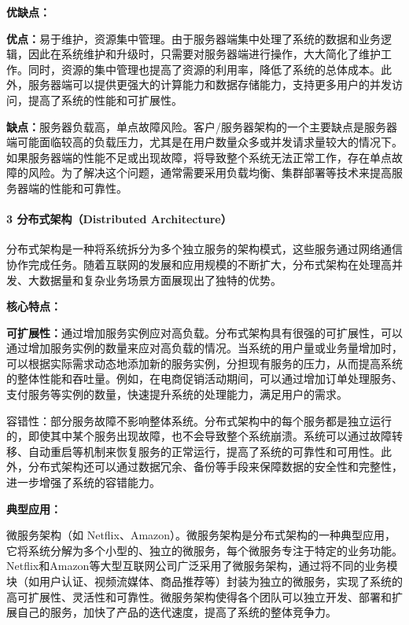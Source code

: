 \textbf{优缺点：}

\textbf{优点：}易于维护，资源集中管理。由于服务器端集中处理了系统的数据和业务逻辑，因此在系统维护和升级时，只需要对服务器端进行操作，大大简化了维护工作。同时，资源的集中管理也提高了资源的利用率，降低了系统的总体成本。此外，服务器端可以提供更强大的计算能力和数据存储能力，支持更多用户的并发访问，提高了系统的性能和可扩展性。

\textbf{缺点：}服务器负载高，单点故障风险。客户/服务器架构的一个主要缺点是服务器端可能面临较高的负载压力，尤其是在用户数量众多或并发请求量较大的情况下。如果服务器端的性能不足或出现故障，将导致整个系统无法正常工作，存在单点故障的风险。为了解决这个问题，通常需要采用负载均衡、集群部署等技术来提高服务器端的性能和可靠性。

\paragraph{3 分布式架构（Distributed Architecture）}\label{ux5206ux5e03ux5f0fux67b6ux6784distributed-architecture}

分布式架构是一种将系统拆分为多个独立服务的架构模式，这些服务通过网络通信协作完成任务。随着互联网的发展和应用规模的不断扩大，分布式架构在处理高并发、大数据量和复杂业务场景方面展现出了独特的优势。

\textbf{核心特点：}

\textbf{可扩展性：}通过增加服务实例应对高负载。分布式架构具有很强的可扩展性，可以通过增加服务实例的数量来应对高负载的情况。当系统的用户量或业务量增加时，可以根据实际需求动态地添加新的服务实例，分担现有服务的压力，从而提高系统的整体性能和吞吐量。例如，在电商促销活动期间，可以通过增加订单处理服务、支付服务等实例的数量，快速提升系统的处理能力，满足用户的需求。

容错性：部分服务故障不影响整体系统。分布式架构中的每个服务都是独立运行的，即使其中某个服务出现故障，也不会导致整个系统崩溃。系统可以通过故障转移、自动重启等机制来恢复服务的正常运行，提高了系统的可靠性和可用性。此外，分布式架构还可以通过数据冗余、备份等手段来保障数据的安全性和完整性，进一步增强了系统的容错能力。

\textbf{典型应用：}

微服务架构（如 Netflix、Amazon）。微服务架构是分布式架构的一种典型应用，它将系统分解为多个小型的、独立的微服务，每个微服务专注于特定的业务功能。Netflix和Amazon等大型互联网公司广泛采用了微服务架构，通过将不同的业务模块（如用户认证、视频流媒体、商品推荐等）封装为独立的微服务，实现了系统的高可扩展性、灵活性和可靠性。微服务架构使得各个团队可以独立开发、部署和扩展自己的服务，加快了产品的迭代速度，提高了系统的整体竞争力。

